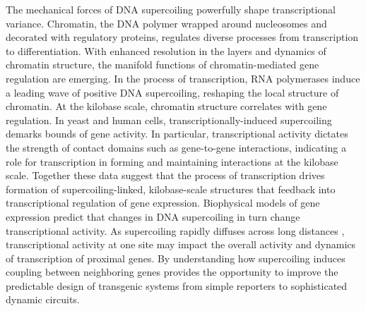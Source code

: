 \documentclass[11pt]{article}
\begin{document}
The mechanical forces of DNA supercoiling powerfully shape transcriptional variance.\parencite{desaiDNArepairPathwayCan2021,chongMechanismTranscriptionalBursting2014}
Chromatin, the DNA polymer wrapped around nucleosomes and decorated with regulatory proteins, regulates diverse processes from transcription to differentiation. With enhanced resolution in the layers and dynamics of chromatin structure, the manifold functions of chromatin-mediated gene regulation are emerging.\parencite{hsiehResolving3DLandscape2020,krietensteinUltrastructuralDetailsMammalian2020}
In the process of transcription, RNA polymerases induce a leading wave of positive DNA supercoiling\parencite{wuTranscriptionGeneratesPositively1988,liuSupercoilingDNATemplate1987}, reshaping the local structure of chromatin.\parencite{acharNegativeSupercoilGene2020,tevesTranscriptiongeneratedTorsionalStress2014a,naughtonTranscriptionFormsRemodels2013,guoHighresolutionGenomewideMapping2021a}
At the kilobase scale, chromatin structure correlates with gene regulation.\parencite{hsiehResolving3DLandscape2020,rowleyEvolutionarilyConservedPrinciples2017}
In yeast and human cells, transcriptionally-induced supercoiling demarks bounds of gene activity.\parencite{acharNegativeSupercoilGene2020,naughtonTranscriptionFormsRemodels2013}
In particular, transcriptional activity dictates the strength of contact domains such as gene-to-gene interactions, indicating a role for transcription in forming and maintaining interactions at the kilobase scale.\parencite{rowleyOrganizationalPrinciples3D2018,rowleyEvolutionarilyConservedPrinciples2017}
Together these data suggest that the process of transcription drives formation of supercoiling-linked, kilobase-scale structures that feedback into transcriptional regulation of gene expression. Biophysical models of gene expression predict that changes in DNA supercoiling in turn change transcriptional activity.\parencite{sevierPropertiesGeneExpression2018}
As supercoiling rapidly diffuses across long distances \parencite{loenhoutDynamicsDNASupercoils2012}, transcriptional activity at one site may impact the overall activity and dynamics of transcription of proximal genes.\parencite{sevierCollectivePolymeraseDynamics2022,tripathiDNASupercoilingmediatedCollective2021}
By understanding how supercoiling induces coupling between neighboring genes provides the opportunity to improve the predictable design of transgenic systems from simple reporters to sophisticated dynamic circuits.
\end{document}
